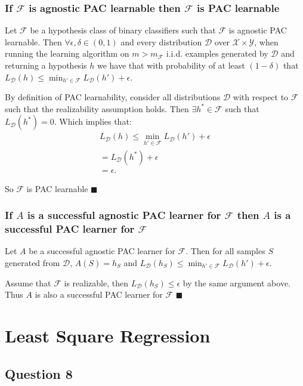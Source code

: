 \documentclass[11pt, oneside]{article}   	%
\begin{document}
\subsubsection{If $\mathcal{F}$ is agnostic PAC learnable then $\mathcal{F}$ is PAC learnable}
Let $\mathcal{F}$ be a hypothesis class of binary classifiers such that $\mathcal{F}$ is agnostic PAC learnable.  Then $\forall \epsilon, \delta \in (0, 1)$ and every distribution $\mathcal{D}$ over $\mathcal{X} \times \mathcal{Y}$, when running the learning algorithm on $m > m_{\mathcal{F}}$ i.i.d. examples generated by $\mathcal{D}$ and returning a hypothesis $h$ we have that with probability of at least $(1 - \delta)$ that $L_{\mathcal{D}}(h) \leq \min_{h' \in \mathcal{F}} L_{\mathcal{D}}(h') + \epsilon$.

By definition of PAC learnability, consider all distributions $\mathcal{D}$ with respect to $\mathcal{F}$ such that the realizability assumption holds.  Then $\exists h^* \in \mathcal{F}$ such that $L_{\mathcal{D}}(h^*) = 0$.  Which implies that: 
\begin{gather*}
L_{\mathcal{D}}(h) \leq \min_{h' \in \mathcal{F}} L_{\mathcal{D}}(h') + \epsilon\\
 = L_{\mathcal{D}}(h^*) + \epsilon\\ 
= \epsilon. 
\end{gather*}

So $\mathcal{F}$ is PAC learnable $\blacksquare$

\subsubsection{If $A$ is a successful agnostic PAC learner for $\mathcal{F}$ then $A$ is a successful PAC learner for $\mathcal{F}$}
Let $A$ be a successful agnostic PAC learner for $\mathcal{F}$.  Then for all samples $S$ generated from $\mathcal{D}$, $A(S) = h_S$ and $L_{\mathcal{D}}(h_S) \leq \min_{h' \in \mathcal{F}} L_{\mathcal{D}}(h') + \epsilon$.

Assume that $\mathcal{F}$ is realizable, then $L_{\mathcal{D}}(h_S) \leq \epsilon$ by the same argument above.  Thus $A$ is also a successful PAC learner for $\mathcal{F}$ $\blacksquare$
\newpage{}
\section{Least Square Regression}
\subsection{Question 8}
\end{document}

